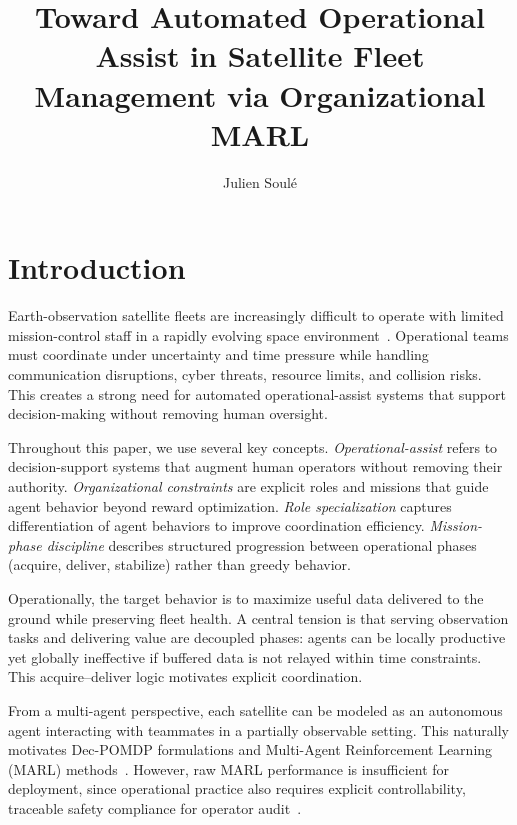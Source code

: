 \documentclass[sigconf]{aamas}
\title[Automated Operational Assist via Organizational MARL]{Toward Automated Operational Assist in Satellite Fleet Management via Organizational MARL}
\author{Julien Soulé}
\affiliation{
  \institution{SEDAN Research Group -- SnT -- University of Luxembourg}
  \city{Luxembourg}
  \country{Luxembourg}}
\begin{document}

\pagestyle{fancy}
\fancyhead{}


\maketitle


\section{Introduction}

Earth-observation satellite fleets are increasingly difficult to operate with limited mission-control staff in a rapidly evolving space environment~\cite{schetter2003satellite_autonomy,rocha2025iaeossp,govoni2026multi_sat_task_allocation}. Operational teams must coordinate under uncertainty and time pressure while handling communication disruptions, cyber threats, resource limits, and collision risks. This creates a strong need for automated operational-assist systems that support decision-making without removing human oversight.

Throughout this paper, we use several key concepts. \emph{Operational-assist} refers to decision-support systems that augment human operators without removing their authority. \emph{Organizational constraints} are explicit roles and missions that guide agent behavior beyond reward optimization. \emph{Role specialization} captures differentiation of agent behaviors to improve coordination efficiency. \emph{Mission-phase discipline} describes structured progression between operational phases (acquire, deliver, stabilize) rather than greedy behavior.

Operationally, the target behavior is to maximize useful data delivered to the ground while preserving fleet health. A central tension is that serving observation tasks and delivering value are decoupled phases: agents can be locally productive yet globally ineffective if buffered data is not relayed within time constraints. This acquire--deliver logic motivates explicit coordination.

From a multi-agent perspective, each satellite can be modeled as an autonomous agent interacting with teammates in a partially observable setting. This naturally motivates Dec-POMDP formulations and Multi-Agent Reinforcement Learning (MARL) methods~\cite{Oliehoek2016,lowe2017multi,rashid2018qmix,yu2021mappo}. However, raw MARL performance is insufficient for deployment, since operational practice also requires explicit controllability, traceable safety compliance for operator audit~\cite{garcia2015comprehensive,achiam2017cpo,alshiekh2018safe}.
\end{document}
